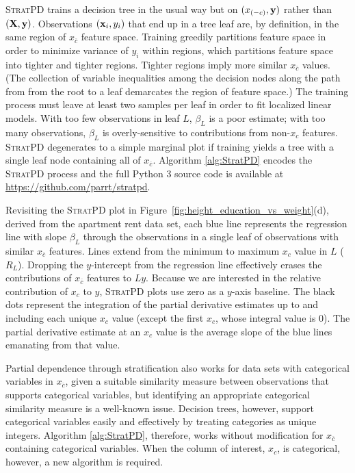\documentclass[12pt]{article}
\newcommand{\figref}[1]{Figure~\ref{#1}}
\newcommand{\spd}{\fontfamily{cmr}\textsc{\small StratPD}}
\newcommand{\xnc}{$x_{\overline{c}}$}
\begin{document}
\spd{} trains a decision tree in the usual way but on $(x_{(-c)}, {\bf y})$ rather than $({\bf X}, {\bf y})$. Observations $({\bf x}_{i}, y_i)$ that end up in a tree leaf are, by definition, in the same region of \xnc{} feature space. Training greedily partitions feature space in order to minimize variance of $y_i$ within regions, which partitions feature space into tighter and tighter regions.  Tighter regions imply more similar \xnc{} values. (The collection of variable inequalities among the decision nodes along the path from from the root to a leaf demarcates the region of feature space.)  The training process must leave at least two samples per leaf in order to fit localized linear models. With too few observations in leaf $L$, $\beta_L$ is a poor estimate; with too many observations, $\beta_L$ is overly-sensitive to contributions from non-$x_c$ features. \spd{} degenerates to a simple marginal plot if training yields a tree with a single leaf node containing all of \xnc{}.  Algorithm \ref{alg:StratPD} encodes the \spd{} process and the full Python 3 source code is available at {\small \url{https://github.com/parrt/stratpd}}.

Revisiting the \spd{} plot in \figref{fig:height_education_vs_weight}(d), derived from the apartment rent data set, each blue line represents the regression line with slope $\beta_L$ through the observations in a single leaf of observations with similar \xnc{} features. Lines extend from the minimum to maximum $x_c$ value in $L$ ($R_L$). Dropping the $y$-intercept from the regression line effectively erases the contributions of \xnc{} features to $Ly$. Because we are interested in the relative contribution of $x_c$ to $y$, \spd{} plots use zero as a $y$-axis baseline. The black dots represent the integration of the partial derivative estimates up to and including each unique $x_c$ value (except the first $x_c$, whose integral value is 0). The partial derivative estimate at an $x_c$ value is the average slope of the blue lines emanating from that value.  

Partial dependence through stratification also works for data sets with categorical variables in \xnc{}, given a suitable similarity measure between observations that supports categorical variables, but identifying an appropriate categorical similarity measure is a well-known issue.  Decision trees, however, support categorical variables easily and effectively by treating categories as unique integers. Algorithm \ref{alg:StratPD}, therefore, works without modification for \xnc{} containing categorical variables. When the column of interest, $x_c$, is categorical, however, a new algorithm is required.
\end{document}
